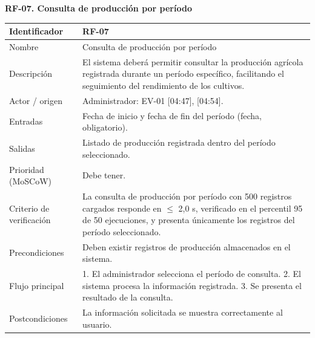 \documentclass[12pt,a4paper]{article}
\begin{document}
\begin{minipage}{\linewidth}
\bigskip
\noindent\textbf{RF-07. Consulta de producción por período}
\label{tab:RF-07}

\begin{center}
\begin{tabular}{|p{3.5cm}|p{10.7cm}|}
\hline
Identificador & RF-07 \\
\hline
Nombre & Consulta de producción por período \\
\hline
Descripción & El sistema deberá permitir consultar la producción agrícola registrada durante un período específico, facilitando el seguimiento del rendimiento de los cultivos. \\
\hline
Actor / origen & Administrador: EV-01 [04:47], [04:54]. \\
\hline
Entradas & Fecha de inicio y fecha de fin del período (fecha, obligatorio). \\
\hline
Salidas & Listado de producción registrada dentro del período seleccionado. \\
\hline
Prioridad (MoSCoW) & Debe tener. \\
\hline
Criterio de verificación & La consulta de producción por período con 500 registros cargados responde en $\leq$ 2,0 s, verificado en el percentil 95 de 50 ejecuciones, y presenta únicamente los registros del período seleccionado. \\
\hline
Precondiciones & Deben existir registros de producción almacenados en el sistema. \\
\hline
Flujo principal & 1. El administrador selecciona el período de consulta. 2. El sistema procesa la información registrada. 3. Se presenta el resultado de la consulta. \\
\hline
Postcondiciones & La información solicitada se muestra correctamente al usuario. \\
\hline
\end{tabular}
\end{center}
\end{minipage}
\end{document}
